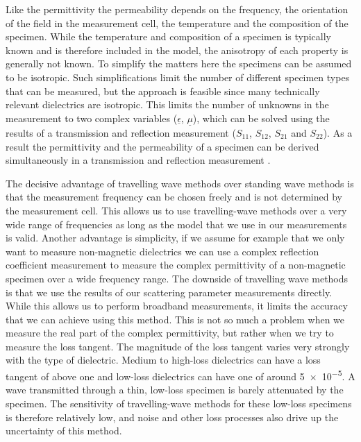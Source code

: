 Like the permittivity the permeability depends on the frequency, the orientation of the field in the measurement cell, the temperature and the composition of the specimen. While the temperature and composition of a specimen is typically known and is therefore included in the model, the anisotropy of each property is generally not known. To simplify the matters here the specimens can be assumed to be isotropic. Such simplifications limit the number of different specimen types that can be measured, but the approach is feasible since many technically relevant dielectrics are isotropic. This limits the number of unknowns in the measurement to two complex variables ($\underline{\epsilon}$, $\underline{\mu}$), which can be solved using the results of a transmission and reflection measurement ($S_{11}$, $S_{12}$, $S_{21}$ and $S_{22}$). As a result the permittivity and the permeability of a specimen can be derived simultaneously in a transmission and reflection measurement \cite{NPL, chen}.

The decisive advantage of travelling wave methods over standing wave methods is that the measurement frequency can be chosen freely and is not determined by the measurement cell. This allows us to use travelling-wave methods over a very wide range of frequencies as long as the model that we use in our measurements is valid. Another advantage is simplicity, if we assume for example that we only want to measure non-magnetic dielectrics we can use a complex reflection coefficient measurement to measure the complex permittivity of a non-magnetic specimen over a wide frequency range. The downside of travelling wave methods is that we use the results of our scattering parameter measurements directly. While this allows us to perform broadband measurements, it limits the accuracy that we can achieve using this method. This is not so much a problem when we measure the real part of the complex permittivity, but rather when we try to measure the loss tangent. The magnitude of the loss tangent varies very strongly with the type of dielectric. Medium to high-loss dielectrics can have a loss tangent of above one and low-loss dielectrics can have one of around \num{5e-5}. A wave transmitted through a thin, low-loss specimen is barely attenuated by the specimen. The sensitivity of travelling-wave methods for these low-loss specimens is therefore relatively low, and noise and other loss processes also drive up the uncertainty of this method.
